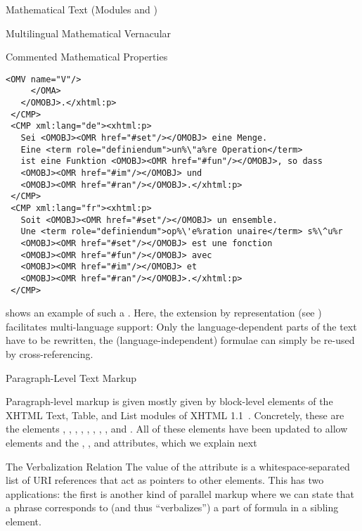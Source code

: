 \begin{tchapter}[id=mtxt,short=Mathematical Text]{Mathematical Text (Modules
  {} and {})}
\begin{tsection}[id=mtext]{Multilingual Mathematical Vernacular}
\begin{tsubsection}{Commented Mathematical Properties}
\begin{lstlisting}[escapechar=\%,label=lst:multiling,mathescape,
  caption={A Multilingual Group of {\element{CMP}} Elements},
  index={trl,xml:lang,CMP,FMP,OMOBJ}]
       <OMV name="V"/>
     </OMA>
   </OMOBJ>.</xhtml:p>
 </CMP>
 <CMP xml:lang="de"><xhtml:p>
   Sei <OMOBJ><OMR href="#set"/></OMOBJ> eine Menge. 
   Eine <term role="definiendum">un%\"a%re Operation</term> 
   ist eine Funktion <OMOBJ><OMR href="#fun"/></OMOBJ>, so dass
   <OMOBJ><OMR href="#im"/></OMOBJ> und 
   <OMOBJ><OMR href="#ran"/></OMOBJ>.</xhtml:p>
 </CMP>
 <CMP xml:lang="fr"><xhtml:p>
   Soit <OMOBJ><OMR href="#set"/></OMOBJ> un ensemble. 
   Une <term role="definiendum">op%\'e%ration unaire</term> s%\^u%r
   <OMOBJ><OMR href="#set"/></OMOBJ> est une fonction 
   <OMOBJ><OMR href="#fun"/></OMOBJ> avec 
   <OMOBJ><OMR href="#im"/></OMOBJ> et 
   <OMOBJ><OMR href="#ran"/></OMOBJ>.</xhtml:p>
 </CMP>
\end{lstlisting}

{} shows an example of such a {}. Here,
the {\openmath} extension by {}
representation (see {}) facilitates multi-language support: Only the
language-dependent parts of the text have to be rewritten, the (language-independent)
formulae can simply be re-used by cross-referencing.
\end{tsubsection}

\begin{tsubsection}[id=rt]{Paragraph-Level Text Markup}

  Paragraph-level markup is given mostly given by block-level elements of the XHTML Text,
  Table, and List modules of XHTML 1.1~\cite{McCarron:xhtmlmods1.1}. Concretely, these are
  the elements , , , ,
  , , , , and . All of
  these elements have been updated to allow  elements and the
  , , and 
  attributes, which we explain next
\end{tsubsection}

\begin{tsubsection}{The Verbalization Relation}
  The value of the  attribute is a whitespace-separated list of
  URI references that act as pointers to other {\omdoc} elements. This has two
  applications: the first is another kind of parallel markup where we can state that a
  phrase corresponds to (and thus ``verbalizes'') a part of formula in a sibling
  {} element.


\end{tsubsection}
\end{tsection}
\end{tchapter}
